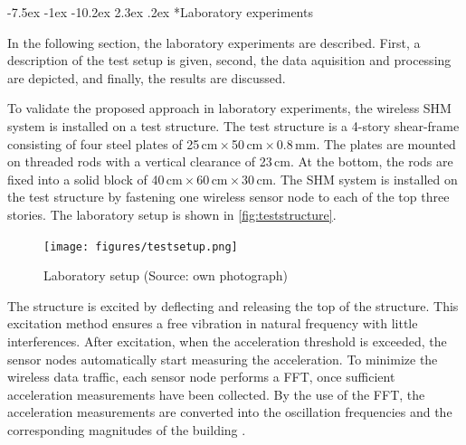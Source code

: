 \documentclass[12pt,a4paper]{scrartcl}
\makeatletter
\renewcommand\section{\@startsection{section}{1}{\z@}%
                     {-7.5ex \@plus -1ex \@minus -10.2ex}%
                     {2.3ex \@plus.2ex}%
                     {\sffamily\large\bfseries}}
\makeatother
\begin{document}
%
%
%
%


\section*{Laboratory experiments}

In the following section, the laboratory experiments are described.
First, a description of the test setup is given, second, the data aquisition and processing are depicted, and finally, the results are discussed. 

To validate the proposed approach in laboratory experiments, the wireless SHM system is installed on a test structure.
The test structure is a 4-story shear-frame consisting of four steel plates of 25\,cm\,$\times$\,50\,cm\,$\times$\,0.8\,mm.
The plates are mounted on threaded rods with a vertical clearance of 23\,cm.
At the bottom, the rods are fixed into a solid block of 40\,cm\,$\times$\,60\,cm\,$\times$\,30\,cm.
The SHM system is installed on the test structure by fastening one wireless sensor node to each of the top three stories.
The laboratory setup is shown in \autoref{fig:teststructure}.

\begin{figure}[ht]
    \centering
    \texttt{[image: figures/testsetup.png]}
    \caption{Laboratory setup (Source: own photograph)}
    \label{fig:teststructure}
\end{figure}

The structure is excited by deflecting and releasing the top of the structure.
This excitation method ensures a free vibration in natural frequency with little interferences.
After excitation, when the acceleration threshold is exceeded, the sensor nodes automatically start measuring the acceleration.
To minimize the wireless data traffic, each sensor node performs a FFT, once sufficient acceleration measurements have been collected.
By the use of the FFT, the acceleration measurements are converted into the oscillation frequencies and the corresponding magnitudes of the building \cite{rao2011fast}.
\end{document}
